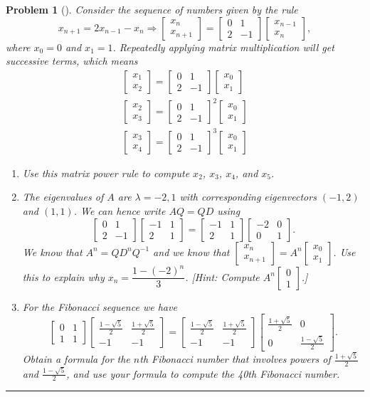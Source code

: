 \documentclass[letterpaper,oneside]{book}%
\theoremstyle{plain}
\theoremstyle{box}
\theoremstyle{problem}
\newtheorem{problemnum}{Problem}[chapter]
\newenvironment{problem}[1][]{\begin{problemnum}[#1]}{\end{problemnum}\nopagebreak\hrule\bigskip}
\newcommand{\bvec}[1]{\begin{bmatrix} #1 \end{bmatrix}}
\begin{document}
\begin{problem}\label{recurrence relation example}
Consider the sequence of numbers given by the rule
$$x_{n+1}=2x_{n-1}-x_{n}
\Rightarrow 
\bvec{x_{n}\\x_{n+1}}=
\bvec{0&1\\ 2&-1}\bvec{x_{n-1}\\x_{n}}
,$$
where $x_0=0$ and $x_1=1$.  
Repeatedly applying matrix multiplication will get successive terms, which means 
\begin{align*}
\bvec{x_{1}\\x_{2}}=
\bvec{0&1\\ 2&-1}\bvec{x_{0}\\x_{1}}
\\
\bvec{x_{2}\\x_{3}}=
\bvec{0&1\\ 2&-1}^2\bvec{x_{0}\\x_{1}}
\\
\bvec{x_{3}\\x_{4}}=
\bvec{0&1\\ 2&-1}^3\bvec{x_{0}\\x_{1}}
\end{align*}
\begin{enumerate}
  \item Use this matrix power rule to compute $x_2$, $x_3$, $x_4$, and $x_5$. 
  \item The eigenvalues of $A$ are $\lambda = -2,1$ with corresponding eigenvectors $(-1,2)$ and $(1,1)$. We can hence write $AQ=QD$ using 
  $$\bvec{0&1\\ 2&-1}\bvec{-1&1\\ 2&1}=\bvec{-1&1\\ 2&1}\bvec{-2&0\\ 0&1}.$$
  We know that $A^n=QD^nQ^{-1}$ and we know that $\bvec{x_{n}\\x_{n+1}}=
A^n\bvec{x_{0}\\x_{1}}$.  Use this to explain why $x_n=\dfrac{1-(-2)^n}{3}$. [Hint: Compute $A^n\bvec{0\\1}$.] 
\item For the Fibonacci sequence we have 
$$\bvec{0&1\\ 1&1}\bvec{\frac{1-\sqrt5}{2}&\frac{1+\sqrt5}{2}\\ -1&-1}=\bvec{\frac{1-\sqrt5}{2}&\frac{1+\sqrt5}{2}\\ -1&-1}\bvec{\frac{1+\sqrt5}{2}&0\\ 0&\frac{1-\sqrt5}{2}}.$$
Obtain a formula for the $n$th Fibonacci number that involves powers of $\frac{1+\sqrt5}{2}$ and $\frac{1-\sqrt5}{2}$, and use your formula to compute the 40th Fibonacci number.
 \end{enumerate}
\end{problem}
\end{document}
